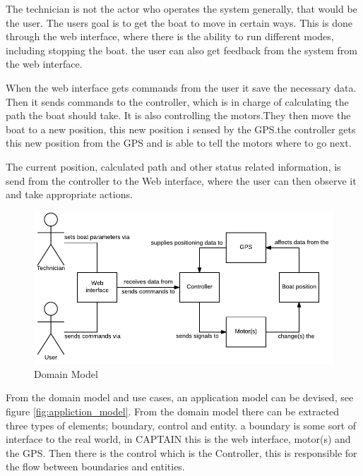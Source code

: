 The technician is not the actor who operates the system generally, that would be the user. The users goal is to get the boat to move in certain ways. This is done through the web interface, where there is the ability to run different modes, including stopping the boat. the user can also get feedback from the system from the web interface.

When the web interface gets commands from the user it save the necessary data. Then it sends commands to the controller, which is in charge of calculating the path the boat should take. It is also controlling the motors.They then move the boat to a new position, this new position i sensed by the GPS.the controller gets this new position from the GPS and is able to tell the motors where to go next.

The current position, calculated path and other status related information, is send from the controller to the Web interface, where the user can then observe it and take appropriate actions.

\begin{figure}[h]
	\centering
	\includegraphics[width=1\linewidth]{Images/System_architecture/Domain_Model}	
	\caption{Domain Model}
	\label{fig:domain_model}
\end{figure}

From the domain model and use cases, an application model can be devised, see figure \ref{fig:appliction_model}. From the domain model there can be extracted three types of elements; boundary, control and entity.
a boundary is some sort of interface to the real world, in CAPTAIN this is the web interface, motor(s) and the GPS. Then there is the control which is the Controller, this is responsible for the flow between boundaries and entities. 


